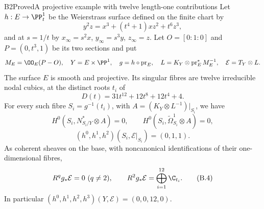 \begin{statement}{B2}{Proved}{A projective example with twelve length-one contributions}
Let $h:E\to\PP^1_t$ be the Weierstrass surface defined on the finite chart by
\[
 y^2z=x^3+(t^4+1)xz^2+t^6z^3,                          \tag{B.3}
\]
and at $s=1/t$ by $x_\infty=s^2x$, $y_\infty=s^3y$, $z_\infty=z$. Let $O=[0:1:0]$ and $P=(0,t^3,1)$ be its two sections and put
\[
 M_E=\OO_E(P-O),\quad Y=E\times\PP^1,\quad
 g=h\circ\operatorname{pr}_E,\quad
 L=K_Y\otimes\operatorname{pr}_E^*M_E^{-1},\quad
 \mathcal E=T_Y\otimes L.
\]
The surface $E$ is smooth and projective. Its singular fibres are twelve irreducible nodal cubics, at the distinct roots $t_i$ of
\[
 D(t)=31t^{12}+12t^8+12t^4+4.
\]
For every such fibre $S_i=g^{-1}(t_i)$, with $A=(K_Y\otimes L^{-1})|_{S_i}$, we have
\[
H^0(S_i,N^*_{S_i/Y}\otimes A)=0,
\qquad H^0(S_i,\widetilde\Omega^1_{S_i}\otimes A)=0,
\]
\[
 (h^0,h^1,h^2)(S_i,\mathcal E|_{S_i})=(0,1,1).
\]
As coherent sheaves on the base, with noncanonical identifications of their one-dimensional fibres,
\[
 R^qg_*\mathcal E=0\ (q\ne2),\qquad
 R^2g_*\mathcal E=\bigoplus_{i=1}^{12}\C_{t_i}.        \tag{B.4}
\]
In particular $(h^0,h^1,h^2,h^3)(Y,\mathcal E)=(0,0,12,0)$.
\end{statement}

